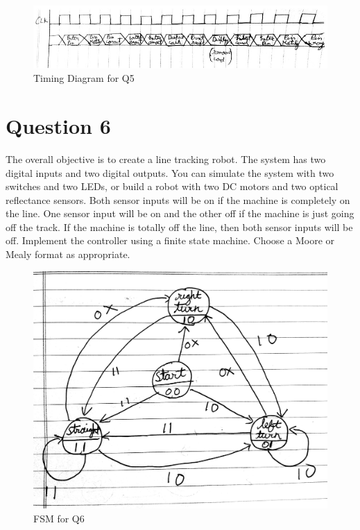 \documentclass[11pt,a4paper]{article}
\begin{document}
	\begin{figure}[H]
		\centering
		\includegraphics[width=1\linewidth]{images/q5timing}
		\caption[]{Timing Diagram for Q5}
		\label{fig:q5timing}
	\end{figure}
	\section*{Question 6}
	The overall objective is to create a line tracking robot. The system has two digital
	inputs and two digital outputs. You can simulate the system with two switches and two LEDs, or build a robot with two DC motors and two optical reflectance sensors. Both sensor inputs will be on if the machine is completely on the line. One sensor input will be on and the other off if the machine is just going off the track. If the machine is totally off the line, then both sensor inputs will be off. Implement the controller using a finite state machine. Choose a Moore or Mealy format as appropriate.
	\begin{figure}[H]
		\centering
		\includegraphics[scale=0.1]{images/q6fsm}
		\caption[]{FSM for Q6}
		\label{fig:q6fsm}
	\end{figure}
	
\end{document}
